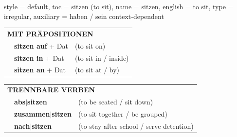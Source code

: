 \begin{verbentry}{
  style = {default},
  toc = {sitzen (to sit)},
  name = {sitzen},
  english = {to sit},
  type = {irregular},
  auxiliary = {haben / sein context-dependent}
}
 \vspace{10pt}

\begin{tabular}{lll}
      \multicolumn{3}{l}{\textbf{MIT PRÄPOSITIONEN}}\\
& \textbf{sitzen auf} + Dat & (to sit on)\\
& \textbf{sitzen in} + Dat & (to sit in / inside)\\
& \textbf{sitzen an} + Dat & (to sit at / by)\\
\end{tabular}
  \hfill
\begin{tabular}{lll}
      \multicolumn{3}{l}{\textbf{TRENNBARE VERBEN}}\\
 & \textbf{abs$|$sitzen} & (to be seated / sit down)\\
 & \textbf{zusammen$|$sitzen} & (to sit together / be grouped)\\
 & \textbf{nach$|$sitzen} & (to stay after school / serve detention)\\
  \end{tabular}
  \vspace{-5pt}
\end{verbentry}

